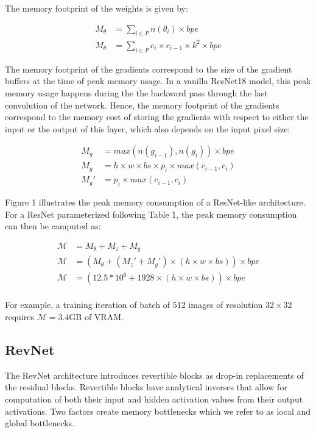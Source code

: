 \documentclass[twocolumn]{bmcart}
\begin{document}
The memory footprint of the weights is given by:

\begin{subequations}
\begin{align}
 M_{\theta} &= \sum_{i \in P}  n(\theta_i)\times bpe \\
 M_{\theta} &= \sum_{i \in P} c_i \times c_{i-1} \times k^2 \times bpe
\end{align}
\end{subequations}

The memory footprint of the gradients correspond to the size of the gradient buffers at the time of peak memory usage. In a vanilla ResNet18 model, this peak memory usage happens during the the backward pass through the last convolution of the network.
Hence, the memory footprint of the gradients correspond to the memory cost of storing the gradients with respect to either the input or the output of this layer, which also depends on the input pixel size:

\begin{subequations}
\begin{align}
M_{g}  &= max(n(g_{i-1}), n(g_i)) \times bpe \\
M_{g}  &= h \times w \times bs \times p_i \times max(c_{i-1}, c_i) \\ 
M_{g}' &= p_i \times max(c_{i-1}, c_i)
\end{align}
\end{subequations}

Figure 1 illustrates the peak memory consumption of a ResNet-like architecture.
For a ResNet parameterized following Table 1, the peak memory consumption can then be camputed as:

\begin{subequations}
\begin{align}
\mathcal{M} &= M_{\theta} + M_{z} + M_{g} \\
\mathcal{M} &= (M_{\theta} + (M_{z}' + M_{g}') \times (h \times w \times bs)) \times bpe \\
\mathcal{M} &= (12.5*10^6 + 1928 \times (h \times w \times bs)) \times bpe \\ 
\end{align}
\end{subequations}

For example, a training iteration of batch of 512 images of resolution $32 \times 32$ requires $\mathcal{M}=3.4$GB of VRAM.

\subsection{RevNet}
The RevNet architecture introduces revertible blocks as drop-in replacements of the residual blocks. 
Revertible blocks have analytical inverses that allow for computation of both their input and hidden activation values from their output activations. 
Two factors create memory bottlenecks which we refer to as local and global bottlenecks.
\end{document}
